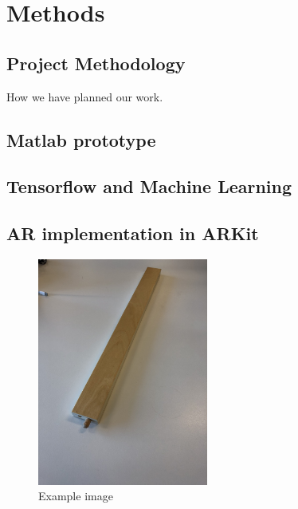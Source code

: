 \section{Methods}


\subsection{Project Methodology}
How we have planned our work.

\subsection{Matlab prototype}


\subsection{Tensorflow and Machine Learning}

\subsection{AR implementation in ARKit}

\begin{figure}[hbtp]
\begin{center}
\includegraphics[width = 0.5\textwidth]{./Images/im1.jpg} 
\caption{Example image}
\end{center}
\end{figure}

\newpage